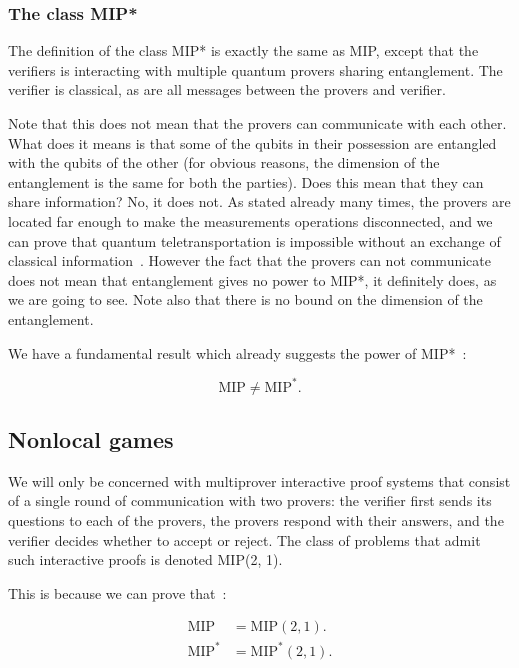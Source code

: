 \subsubsection{The class MIP*}
The definition of the class MIP* is exactly the same as MIP, except that the verifiers is interacting with multiple quantum provers sharing entanglement. The verifier is classical, as are all messages between the provers and verifier. 

Note that this does not mean that the provers can communicate with each other. What does it means is that some of the qubits in their possession are entangled with the qubits of the other (for obvious reasons, the dimension of the entanglement is the same for both the parties). Does this mean that they can share information? No, it does not. As stated already many times, the provers are located far enough to make the measurements operations disconnected, and we can prove that quantum teletransportation is impossible without an exchange of classical information~\cite{NielsenChuang}. However the fact that the provers can not communicate does not mean that entanglement gives no power to MIP*, it definitely does, as we are going to see.
Note also that there is no bound on the dimension of the entanglement.

We have a fundamental result which already suggests the power of MIP*~\cite{mipre}:

\begin{theorem}
    \begin{equation}
\text{MIP} \neq \text{MIP}^{*}.
    \end{equation}
\end{theorem}

\subsection{Nonlocal games}

We will only be concerned with multiprover interactive proof systems
that consist of a single round of communication with two provers: the verifier first sends its questions to
each of the provers, the provers respond with their answers, and the verifier decides whether to accept or
reject. The class of problems that admit such interactive proofs is denoted MIP(2, 1).

This is because we can prove that~\cite{mipre}:
\begin{theorem}
    \begin{align}
    \text{MIP}&=\text{MIP}(2,1). \\
    \text{MIP}^{*}&=\text{MIP}^{*}(2,1).
    \end{align}
\end{theorem}

